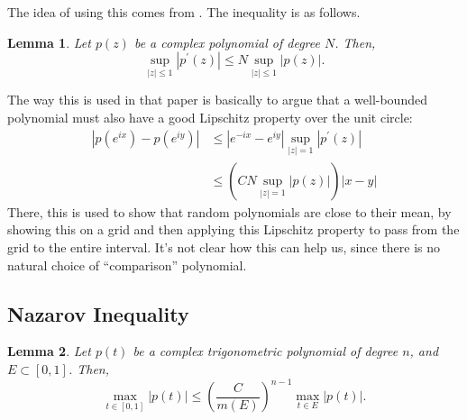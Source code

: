 \documentclass[11pt]{article}
\newtheorem{lemma}{Lemma}
\begin{document}
The idea of using this comes from \cite{tang2013compressed}.
The inequality is as follows.

\begin{lemma}
    Let $p(z)$ be a complex polynomial of degree $N$.
    Then,
    \[ \sup_{|z| \leq 1} |p^\prime(z)| \leq N\sup_{|z| \leq 1}|p(z)|. \]
\end{lemma}
The way this is used in that paper is basically to argue that a well-bounded polynomial must also have a good Lipschitz property over the unit circle:
\begin{align*}
  |p(e^{ix}) - p(e^{iy})|
  &\leq |e^{-ix} - e^{iy}|\sup_{|z| = 1}|p^\prime(z)| \\
  &\leq \left(CN\sup_{|z| = 1}|p(z)|\right) |x - y|
\end{align*}
There, this is used to show that random polynomials are close to their mean, by showing this on a grid and then applying this Lipschitz property to pass from the grid to the entire interval.
It's not clear how this can help us, since there is no natural choice of ``comparison'' polynomial.

\subsection{Nazarov Inequality}

\begin{lemma}
    Let $p(t)$ be a complex trigonometric polynomial of degree $n$, and $E \subset [0, 1]$.
    Then,
    \[ \max_{t \in [0, 1]} |p(t)| \leq \left(\frac{C}{m(E)}\right)^{n - 1}\max_{t \in E}|p(t)|. \]
\end{lemma}




\end{document}
